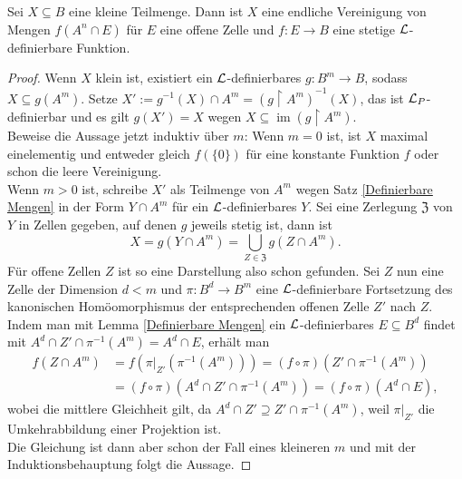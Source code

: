 \begin{lemma}
	Sei $X\subseteq B$ eine kleine Teilmenge. Dann ist $X$ eine endliche Vereinigung von Mengen $f(A^n\cap E)$ für $E$ eine offene Zelle und $f:E\rightarrow B$ eine stetige $\mathcal{L}$-definierbare Funktion.
\end{lemma}
\begin{proof}
	Wenn $X$ klein ist, existiert ein $\mathcal{L}$-definierbares $g:B^m\rightarrow B$, sodass $X\subseteq g(A^m)$. Setze $X':=g^{-1}(X)\cap A^m=(g\upharpoonright A^m)^{-1}(X)$, das ist $\mathcal{L}_P$-definierbar und es gilt $g(X')=X$ wegen $X\subseteq\operatorname{im}(g\upharpoonright A^m)$.\\
	Beweise die Aussage jetzt induktiv über $m$: Wenn $m=0$ ist, ist $X$ maximal einelementig und entweder gleich $f(\{0\})$ für eine konstante Funktion $f$ oder schon die leere Vereinigung.\\
	Wenn $m>0$ ist, schreibe $X'$ als Teilmenge von $A^m$ wegen Satz \ref{Definierbare Mengen} in der Form $Y\cap A^m$ für ein $\mathcal{L}$-definierbares $Y$. Sei eine Zerlegung $\mathfrak{Z}$ von $Y$ in Zellen gegeben, auf denen $g$ jeweils stetig ist, dann ist $$X=g(Y\cap A^m)=\bigcup\limits_{Z\in\mathfrak{Z}}g(Z\cap A^m).$$
	Für offene Zellen $Z$ ist so eine Darstellung also schon gefunden. Sei $Z$ nun eine Zelle der Dimension $d<m$ und $\pi:B^d\rightarrow B^m$ eine $\mathcal{L}$-definierbare Fortsetzung des kanonischen Homöomorphismus der entsprechenden offenen Zelle $Z'$ nach $Z$. Indem man mit Lemma \ref{Definierbare Mengen} ein $\mathcal{L}$-definierbares $E\subseteq B^d$ findet mit $A^d\cap Z'\cap\pi^{-1}(A^m)=A^d\cap E$, erhält man 
	\begin{align*}
	f(Z\cap A^m)&=f(\pi|_{Z'}(\pi^{-1}(A^m)))=(f\circ\pi)(Z'\cap\pi^{-1}(A^m))\\&=(f\circ\pi)(A^d\cap Z'\cap\pi^{-1}(A^m))=(f\circ\pi)(A^d\cap E),
	\end{align*}
	wobei die mittlere Gleichheit gilt, da $A^d\cap Z'\supseteq Z'\cap\pi^{-1}(A^m)$, weil $\pi|_{Z'}$ die Umkehrabbildung einer Projektion ist.\\
	Die Gleichung ist dann aber schon der Fall eines kleineren $m$ und mit der Induktionsbehauptung folgt die Aussage.
\end{proof}

